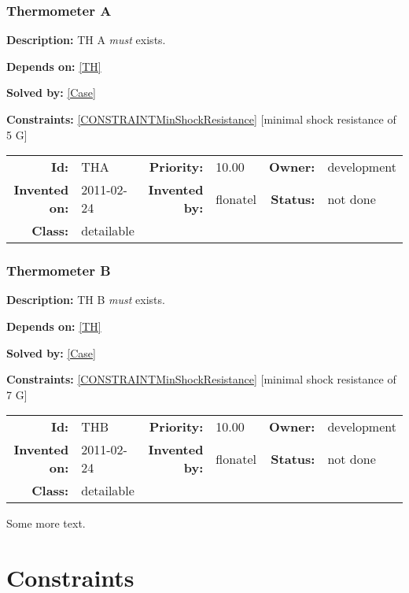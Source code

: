 \subsection{Thermometer A}\label{THA}
\textbf{Description:} TH A \textsl{must} exists.

\textbf{Depends on:} \ref{TH} 

\textbf{Solved by:} \ref{Case} 

\textbf{Constraints:} \ref{CONSTRAINTMinShockResistance}  [minimal shock resistance of 5 G] 

\par
{\small \begin{center}\begin{tabular}{rlrlrl}
\textbf{Id:} & THA  & \textbf{Priority:} & 10.00  & \textbf{Owner:} & development\\ 
\textbf{Invented on:} & 2011-02-24  & \textbf{Invented by:} & flonatel  & \textbf{Status:} & not done \\ 
\textbf{Class:} & detailable  & & & \end{tabular}\end{center} }

\subsection{Thermometer B}\label{THB}
\textbf{Description:} TH B \textsl{must} exists.

\textbf{Depends on:} \ref{TH} 

\textbf{Solved by:} \ref{Case} 

\textbf{Constraints:} \ref{CONSTRAINTMinShockResistance}  [minimal shock resistance of 7 G] 

\par
{\small \begin{center}\begin{tabular}{rlrlrl}
\textbf{Id:} & THB  & \textbf{Priority:} & 10.00  & \textbf{Owner:} & development\\ 
\textbf{Invented on:} & 2011-02-24  & \textbf{Invented by:} & flonatel  & \textbf{Status:} & not done \\ 
\textbf{Class:} & detailable  & & & \end{tabular}\end{center} }

Some more text.
\chapter{Constraints}
